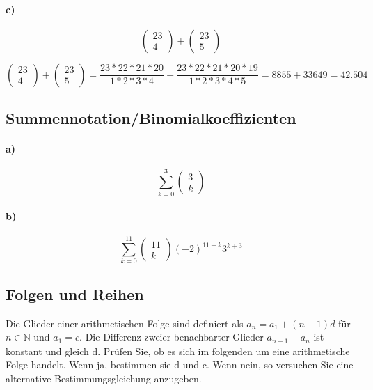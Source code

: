\documentclass[paper=a4, fontsize=11pt]{scrartcl}
\numberwithin{equation}{section}
\numberwithin{figure}{section}
\numberwithin{table}{section}
\begin{document}
\paragraph{c)}
$$\left(\begin{array}{c} 23 \\ 4 \end{array}\right)+\left(\begin{array}{c} 23 \\ 5 \end{array}\right)$$

$\left(\begin{array}{c} 23 \\ 4 \end{array}\right)+\left(\begin{array}{c} 23 \\ 5 \end{array}\right)
= \dfrac{23*22*21*20}{1*2*3*4}
+ \dfrac{23*22*21*20*19}{1*2*3*4*5}
=8855+33649 = 42.504$
\subsection{Summennotation/Binomialkoeffizienten}
\paragraph{a)}
$$\sum^{3}_{k=0} \left(\begin{array}{c} 3 \\ k \end{array}\right)$$

\paragraph{b)}
$$\sum^{11}_{k=0} \left(\begin{array}{c} 11 \\ k \end{array}\right) (-2)^{11-k} 3^{k+3}$$

\subsection{Folgen und Reihen}
Die Glieder einer arithmetischen Folge sind definiert als $a_{n}=a_{1}+(n-1)d$ für $n \in \mathbb{N}$ und $a_{1}=c$. Die Differenz zweier benachbarter Glieder $a_{n+1}-a_{n}$ ist konstant und gleich d. Prüfen Sie, ob es sich im folgenden um eine arithmetische Folge handelt. Wenn ja, bestimmen sie d und c. Wenn nein, so versuchen Sie eine alternative Bestimmungsgleichung anzugeben.
\end{document}
